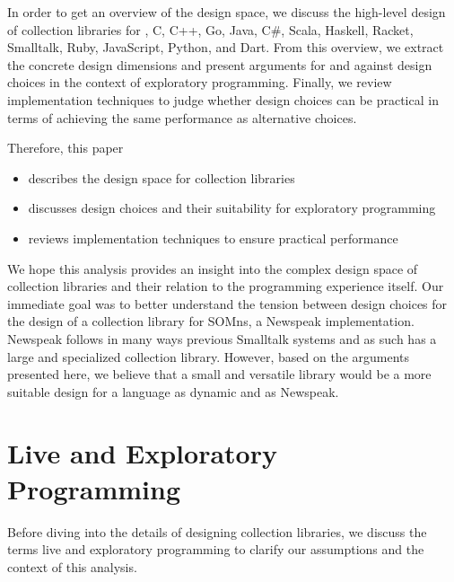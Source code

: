 \documentclass[sigconf, 10pt]{acmart}
\def\SOMns{SOM{\sc ns}\xspace}
\begin{document}
In order to get an overview of the design space,
we discuss the high-level design of collection libraries for
, C, C++, Go, Java, C\#, Scala, Haskell, Racket, Smalltalk, Ruby, JavaScript, Python, and Dart.
From this overview, we extract the concrete design dimensions
and present arguments for and against design choices
in the context of exploratory programming.
Finally, we review implementation techniques
to judge whether design choices can be practical
in terms of achieving the same performance as alternative choices.

Therefore, this paper

\begin{itemize}
  \item describes the design space for collection libraries
  \item discusses design choices and their suitability for exploratory programming
  \item reviews implementation techniques to ensure practical performance
\end{itemize}

We hope this analysis provides an insight
into the complex design space of collection libraries
and their relation to the programming experience itself.
Our immediate goal was to better understand the tension between design choices
for the design of a collection library for \SOMns, a Newspeak implementation\citep{Bracha:10:NS,OptCELWithTruffle}.
Newspeak follows in many ways previous Smalltalk systems
and as such has a large and specialized collection library.
However, based on the arguments presented here,
we believe that a small and versatile library would be a more suitable design
for a language as dynamic and  as Newspeak.


\section{Live and Exploratory Programming}
\label{sec:exploratory}

Before diving into the details of designing collection libraries,
we discuss the terms live and exploratory programming
to clarify our assumptions and the context of this analysis.
\end{document}
